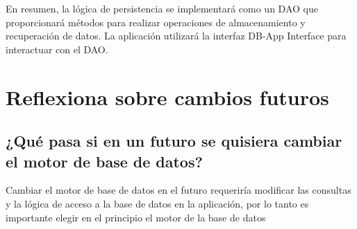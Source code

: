 En resumen, la lógica de persistencia se implementará como un DAO que proporcionará métodos para realizar operaciones de almacenamiento y recuperación de datos. La aplicación utilizará la interfaz DB-App Interface para interactuar con el DAO.


\begin{figure}[!ht]
	\centering
	\label{fig:my_label}
\end{figure}




\section{Reflexiona sobre cambios futuros}
\subsection*{¿Qué pasa si en un futuro se quisiera cambiar el motor de base de datos?}
Cambiar el motor de base de datos en el futuro requeriría modificar las consultas y la lógica de acceso a la base de datos en la aplicación, por lo tanto es importante elegir en el principio el motor de la base de datos

